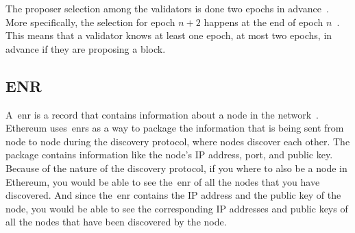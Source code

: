 The proposer selection among the validators is done two epochs in advance~\cite{random-selection}.
More specifically, the selection for epoch $n+2$ happens at the end of epoch $n$~\cite{upgrading-ethereum-randomness}.
This means that a validator knows at least one epoch, at most two epochs, in advance if they are proposing a block.


\subsection{ENR}\label{subsec:enr}
A~\gls{enr} is a record that contains information about a node in the network~\cite{EIP-778:Ethereum-Node-Records}.
Ethereum uses~\glspl{enr} as a way
to package the information that is being sent from node to node during the discovery protocol,
where nodes discover each other.
The package contains information like the node's IP address, port, and public key.
Because of the nature of the discovery protocol, if you where to also be a node in Ethereum,
you would be able to see the~\gls{enr} of all the nodes that you have discovered.
And since the~\gls{enr} contains the IP address and the public key of the node,
you would be able
to see the corresponding IP addresses and public keys of all the nodes that have been discovered by the node.


